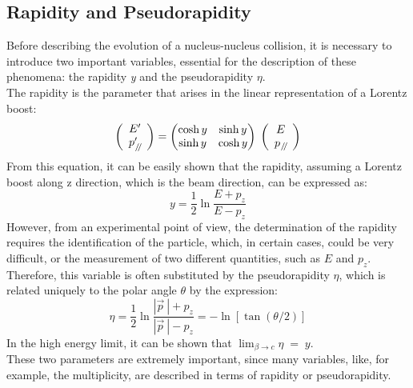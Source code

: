\subsection{Rapidity and Pseudorapidity}
Before describing the evolution of a nucleus-nucleus collision, it is necessary to introduce two important variables, essential for the description of these phenomena: the rapidity \textit{y} and the pseudorapidity $\eta$.\\
The rapidity is the parameter that arises in the linear representation of a Lorentz boost:
\begin{equation}
 \left(
    \begin{array}{c}
      E'\\
      p'_{\:\mathbin{\!/\mkern-4mu/\!}}
    \end{array}
  \right) = 
      \begin{pmatrix}
      \cosh y & \sinh y \\
      \sinh y & \cosh y 
    \end{pmatrix}
  \;
  \left(
     \begin{array}{c}
      E\\
      p_{\:\mathbin{\!/\mkern-4mu/\!}}
    \end{array}
  \right)
\end{equation}
%
From this equation, it can be easily shown that the rapidity, assuming a Lorentz boost along z direction, which is the beam direction, can be expressed as:
\begin{equation}
 y = \frac{1}{2}\ln\frac{E + p_{z}}{E - p_{z}}
\end{equation}
However, from an experimental point of view, the determination of the rapidity requires the identification of the particle, which, in certain cases, could be very difficult, or the measurement of two different quantities, such as $E$ and $p_{z}$. Therefore, this variable is often substituted by the pseudorapidity $\eta$, which is related uniquely to the polar angle $\theta$ by the expression:
\begin{equation}
 \eta = \frac{1}{2}\ln\frac{|\vec{p}\:| + p_{z}}{|\vec{p}\:| - p_{z}} = - \ln [\tan (\theta/2)]
\end{equation}
In the high energy limit, it can be shown that $\lim_{\beta \to c} \eta \;= \;y$.\\
These two parameters are extremely important, since many variables, like, for example, the multiplicity, are described in terms of rapidity or pseudorapidity.\\


